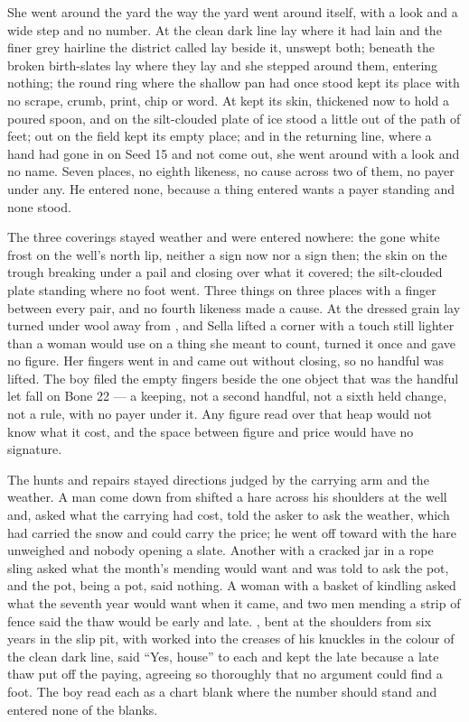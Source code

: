 She went around the yard the way the yard went around itself, with a look and a wide step and no number. At  the clean dark line lay where it had lain and the finer grey hairline the district called  lay beside it, unswept both; beneath  the broken birth-slates lay where they lay and she stepped around them, entering nothing; the round ring where the shallow pan had once stood kept its place with no scrape, crumb, print, chip or word. At   kept its skin, thickened now to hold a poured spoon, and on  the silt-clouded plate of ice stood a little out of the path of feet; out on  the field kept its empty place; and in the returning line, where a hand had gone in on Seed 15 and not come out, she went around with a look and no name. Seven places, no eighth likeness, no cause across two of them, no payer under any. He entered none, because a thing entered wants a payer standing and none stood.

The three coverings stayed weather and were entered nowhere: the gone white frost on the well's north lip, neither a sign now nor a sign then; the skin on the trough breaking under a pail and closing over what it covered; the silt-clouded plate standing where no foot went. Three things on three places with a finger between every pair, and no fourth likeness made a cause. At  the dressed grain lay turned under wool away from , and Sella lifted a corner with a touch still lighter than a woman would use on a thing she meant to count, turned it once and gave no figure. Her fingers went in and came out without closing, so no handful was lifted. The boy filed the empty fingers beside the one object that was the handful let fall on Bone 22 --- a keeping, not a second handful, not a sixth held change, not a rule, with no payer under it. Any figure read over that heap would not know what it cost, and the space between figure and price would have no signature.

The hunts and repairs stayed directions judged by the carrying arm and the weather. A man come down from  shifted a hare across his shoulders at the well and, asked what the carrying had cost, told the asker to ask the weather, which had carried the snow and could carry the price; he went off toward  with the hare unweighed and nobody opening a slate. Another with a cracked jar in a rope sling asked what the month's mending would want and was told to ask the pot, and the pot, being a pot, said nothing. A woman with a basket of kindling asked what the seventh year would want when it came, and two men mending a strip of fence said the thaw would be early and late. , bent at the shoulders from six years in the slip pit, with  worked into the creases of his knuckles in the colour of the clean dark line, said “Yes, house” to each and kept the late because a late thaw put off the paying, agreeing so thoroughly that no argument could find a foot. The boy read each as a chart blank where the number should stand and entered none of the blanks.

